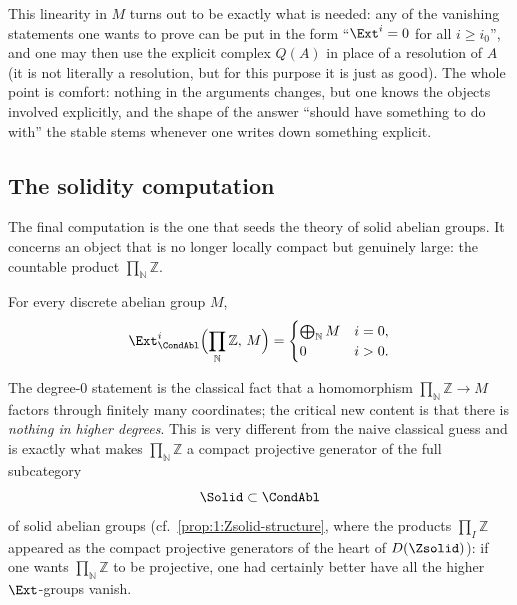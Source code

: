 This linearity in $M$ turns out to be exactly what is needed: any of the
vanishing statements one wants to prove can be put in the form ``$\Ext^{i}=0$ for
all $i\geq i_0$'', and one may then use the explicit complex $Q(A)$ in place of a
resolution of $A$ (it is not literally a resolution, but for this purpose it is
just as good). The whole point is comfort: nothing in the arguments changes, but
one knows the objects involved explicitly, and the shape of the answer ``should
have something to do with'' the stable stems whenever one writes down something
explicit.

\subsection{The solidity computation}

The final computation is the one that seeds the theory of solid abelian groups.
It concerns an object that is no longer locally compact but genuinely large: the
countable product $\prod_{\mathbb{N}}\mathbb{Z}$.

\begin{corollary}
\label{cor:4:solid-generator}
For every discrete abelian group $M$,
\begin{equation*}
\Ext^{i}_{\CondAbl}\Bigl(\prod_{\mathbb{N}}\mathbb{Z},\,M\Bigr)=
\begin{cases}
\bigoplus_{\mathbb{N}}M & i=0,\\
0 & i>0.
\end{cases}
\end{equation*}
\end{corollary}

The degree-$0$ statement is the classical fact that a homomorphism
$\prod_{\mathbb{N}}\mathbb{Z}\to M$ factors through finitely many coordinates; the
critical new content is that there is \emph{nothing in higher degrees}. This is
very different from the naive classical guess and is exactly what makes
$\prod_{\mathbb{N}}\mathbb{Z}$ a compact projective generator of the full
subcategory
\begin{equation*}
\Solid\subset\CondAbl
\end{equation*}
of solid abelian groups (cf.\ \cref{prop:1:Zsolid-structure}, where the products
$\prod_{I}\mathbb{Z}$ appeared as the compact projective generators of the heart
of $D(\Zsolid)$): if one wants $\prod_{\mathbb{N}}\mathbb{Z}$ to be projective,
one had certainly better have all the higher $\Ext$-groups vanish.


